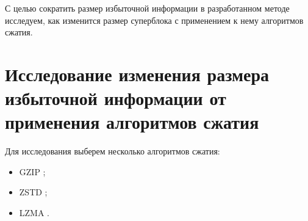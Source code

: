 

%



С целью сократить размер избыточной информации в разработанном методе исследуем, как изменится размер суперблока с применением к нему алгоритмов сжатия.  
\newpage
\section{Исследование изменения размера избыточной информации от применения алгоритмов сжатия}

\begin{flushleft}
Для исследования выберем несколько алгоритмов сжатия:
\end{flushleft}
\begin{itemize}
\item GZIP \cite{gzip};
\item ZSTD \cite{zstd};
\item LZMA \cite{lzma}.
\end{itemize}

